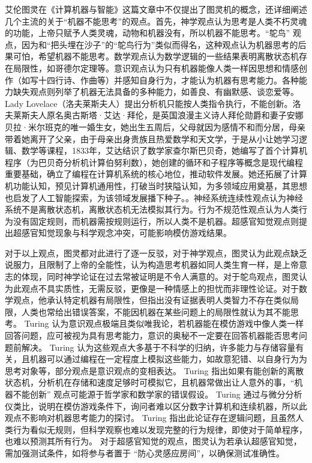 艾伦图灵在《计算机器与智能》这篇文章中不仅提出了图灵机的概念，还详细阐述几个主流的关于“机器不能思考”的观点。首先，神学观点认为思考是人类不朽灵魂的功能，上帝只赋予人类灵魂，动物和机器没有，所以机器不能思考。“鸵鸟” 观点，因为和“把头埋在沙子”的“鸵鸟行为”类似而得名，这种观点认为机器思考的后果可怕，希望机器不能思考。数学观点认为数学逻辑的一些结果表明离散状态机存在局限性，如哥德尔定理等。意识观点认为只有机器能像人类一样因思想和情感创作（如写十四行诗、作曲等）并感知自身行为，才能认为机器有思考能力。各种能力缺失观点则列举了机器无法具备的多种能力，如善良、有幽默感、谈恋爱等。Lady Lovelace（洛夫莱斯夫人）提出分析机只能按人类指令执行，不能创新。洛夫莱斯夫人原名奥古斯塔·艾达·拜伦，是英国浪漫主义诗人拜伦勋爵和妻子安娜贝拉·米尔班克的唯一婚生女，她出生五周后，父母就因为感情不和而分居，母亲带着她离开了父亲，由于母亲出身贵族且热爱数学和天文学，于是从小让她学习逻辑、数学等课程，1833年，艾达结识了数学家查尔斯巴贝奇，她编写了首个计算机程序（为巴贝奇分析机计算伯努利数），她创建的循环和子程序等概念是现代编程重要基础，确立了编程在计算机系统的核心地位，推动软件发展。她还拓展了计算机功能认知，预见计算机通用性，打破当时狭隘认知，为多领域应用奠基，其思想也启发了人工智能探索，为该领域发展播下种子。。神经系统连续性观点认为神经系统不是离散状态机，离散状态机无法模拟其行为。行为不规范性观点认为人类行为没有固定规则，而机器需按规则运行，所以人类不是机器。超感官知觉观点则提出超感官知觉现象与科学观念冲突，可能影响模仿游戏结果。


对于以上观点，图灵都对此进行了逐一反驳，对于神学观点，图灵认为此观点缺乏说服力，且限制了上帝的全能性，认为构造思考机器如同人类生育一样，是上帝意志的体现，同时神学论证在过去常被证明是不令人满意的。对于鸵鸟观点，图灵认为此观点不具实质性，无需反驳，更像是一种情感上的担忧而非理性论证。对于数学观点，他承认特定机器有局限性，但指出没有证据表明人类智力不存在类似局限，人类也常给出错误答案，不能因机器在某些问题上的局限性就认为其不能思考。
Turing 认为意识观点极端且类似唯我论，若机器能在模仿游戏中像人类一样回答问题，应可被视为具有思考能力，意识的奥秘不一定要在回答机器能否思考问题前解决。
Turing 认为这些观点大多基于不科学的归纳，许多能力与存储容量有关，且机器可以通过编程在一定程度上模拟这些能力，如故意犯错、以自身行为为思考对象等，部分观点是意识观点的变相表达。
Turing 指出如果有能创新的离散状态机，分析机在存储和速度足够时可模拟它，且机器常做出让人意外的事，“机器不能创新” 观点可能源于哲学家和数学家的错误假设。
Turing 通过与微分分析仪类比，说明在模仿游戏条件下，询问者难以区分数字计算机和连续机器，所以此观点不影响对机器思考能力的探讨。
Turing 指出此论证存在逻辑问题，且虽然人类行为看似无规则，但科学观察也难以发现完整的行为规律，即使对于简单程序，也难以预测其所有行为。
对于超感官知觉的观点，图灵认为若承认超感官知觉，需加强测试条件，如将参与者置于 “防心灵感应房间”，以确保测试准确性。


